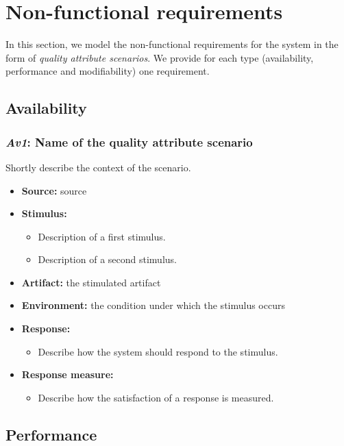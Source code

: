 \documentclass[a4paper,10pt]{article}
\begin{document}
\section{Non-functional requirements}\label{sec:non-functional}
In this section, we model the non-functional requirements for the system in the
form of \emph{quality attribute scenarios}. We provide for each type
(availability, performance and modifiability) one requirement.

\subsection{Availability}
\subsubsection{\emph{Av1}: Name of the quality attribute scenario}
Shortly describe the context of the scenario.

\begin{itemize}
    \item \textbf{Source:} source
    \item \textbf{Stimulus:}
        \begin{itemize}
            \item Description of a first stimulus.
            \item Description of a second stimulus.
        \end{itemize}

    \item \textbf{Artifact:} the stimulated artifact
    \item \textbf{Environment:} the condition under which the stimulus occurs
    \item \textbf{Response:}
        \begin{itemize}
            \item Describe how the system should respond to the stimulus.
        \end{itemize}

    \item \textbf{Response measure:}
        \begin{itemize}
            \item Describe how the satisfaction of a response is measured.
        \end{itemize}
\end{itemize}

\subsection{Performance}
\end{document}
